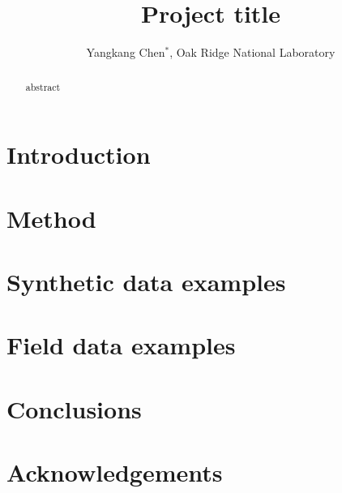 \title{Project title}

\author{Yangkang Chen$^*$, Oak Ridge National Laboratory}

\maketitle

\begin{abstract}
abstract
\end{abstract}

\section{Introduction}

\section{Method}

\section{Synthetic data examples}

\section{Field data examples}

 
\section{Conclusions}


\section{Acknowledgements}


\onecolumn






